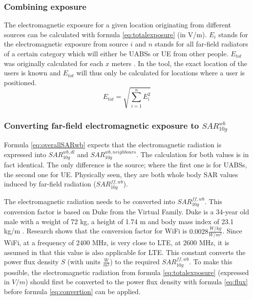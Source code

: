 \subsubsection{Combining exposure}
The electromagnetic exposure for a given location originating from different sources can be calculated with formula \ref{eq:totalexposure} (in V/m). $E_i$ stands for 
the electromagnetic exposure from source $i$ and
$n$ stands for all far-field radiators of a certain category which will either be \gls{UABS}s or \gls{UE} from other people.
$E_{tot}$ was originally calculated for each $x$ meters \cite{J1}. In the tool, the exact location of the users is known and $E_{tot}$ will thus 
only be calculated for locations where a user is positioned.  
\begin{equation}
E_{tot} = \sqrt{\sum_{i=1}^{n} E_i^2}
\label{eq:totalexposure}
\end{equation}

\subsubsection{Converting far-field electromagnetic exposure to $SAR^{wb}_{10g}$}
\label{sub:convertDLtosarwb}

Formula \ref{eq:overallSARwb} expects that the electromagnetic radiation is expressed into $SAR^{wb,dl}_{10g}$ and $SAR^{wb,neighbours}_{10g}$. The 
calculation for both values is in fact identical. The only difference is the source; where the first one is for \gls{UABS}s, the second one for \gls{UE}.
Physically seen, they are both whole body SAR values induced by far-field radiation ($SAR^{ff,wb}_{10g}$).

The electromagnetic radiation needs to be converted into $SAR^{ff,wb}_{10g}$. 
This conversion factor is based on Duke from the Virtual Family. Duke is a 34-year old male with a weight of 72 kg, a height of 1.74 m and body
mass index of 23.1 kg/m \cite{J22_plets2015joint}. Research shows that the conversion factor for WiFi is $0.0028 \frac{W/kg}{W/m^2}$.
 Since WiFi, at a frequency of 2400 MHz,
is very close to LTE, at 2600 MHz, it is assumed in \cite{J22_plets2015joint} that this value is also applicable for \gls{LTE}.
This constant converts the \gls{power flux density} $S$ (with units $\frac{W}{m^2}$) to the required $SAR^{ff,wb}_{10g}$.
To make this possible, the electromagnetic radiation
from formula \ref{eq:totalexposure} (expressed in  $V/m$) should first be converted to the  \gls{power flux density} with formula 
\ref{eq:flux} before formula \ref{eq:convertion} can be applied.

